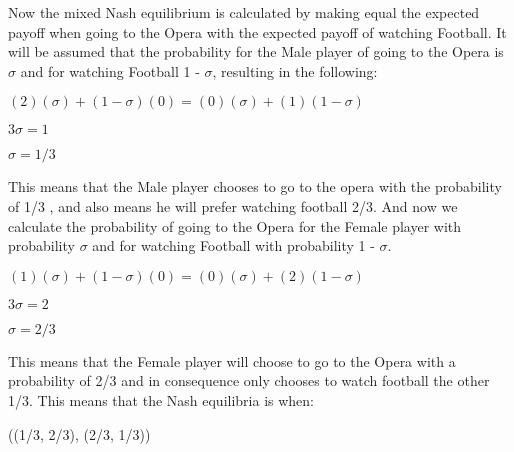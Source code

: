 Now the mixed Nash equilibrium is calculated by making equal the expected payoff  when going to the Opera with the expected payoff of watching Football. It will be assumed that the probability for the Male player of going to the Opera is $\sigma$ and for watching Football 1 - $\sigma$, resulting in the following:
\begin{center}
$(2)(\sigma) + (1 - \sigma)(0) = (0)(\sigma) + (1)(1 - \sigma)$
\end{center}
\begin{center}
$3\sigma = 1$
\end{center}
\begin{center}
$\sigma = 1/3$
\end{center}
This means that the Male player chooses to go to the opera with the probability of 1/3 , and also means he will prefer watching football 2/3. And now we calculate the probability of going to the Opera for the Female player with probability $\sigma$ and for watching Football with probability 1 - $\sigma$.

\begin{center}
$(1)(\sigma) + (1 - \sigma)(0) = (0)(\sigma) + (2)(1 - \sigma)$
\end{center}
\begin{center}
$3\sigma = 2$
\end{center}
\begin{center}
$\sigma = 2/3$
\end{center}

This means that the Female player will choose to go to the Opera with a probability of 2/3 and in consequence only chooses to watch football the other 1/3. 
This means that the Nash equilibria is when:
\begin{center}
((1/3, 2/3), (2/3, 1/3))
\end{center}

